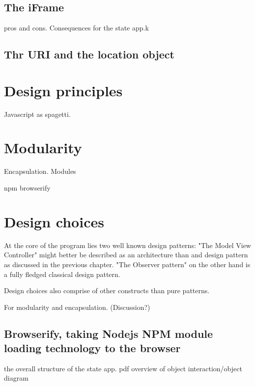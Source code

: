 \documentclass[english]{ifimaster}
\begin{document}

\subsection{The iFrame}
pros and cons. Consequences for the state app.k


\subsection{Thr URI and the location object}
\section{Design principles}
Javascript as spagetti.
\section{Modularity}
Encapsulation.
Modules

npm
browserify

\section{Design choices}

At the core of the program lies two well known design patterns: "The Model View Controller" might better be described as an architecture than and design pattern as discussed in the previous chapter. "The Observer pattern" on the other hand is a fully fledged classical design pattern.

Design choices also comprise of other constructs than pure patterns.


For modularity and encapsulation. (Discussion?)
\subsection{Browserify, taking Nodejs NPM module loading technology to the browser}

the overall structure of the state app.
pdf overview of object interaction/object diagram
\end{document}
